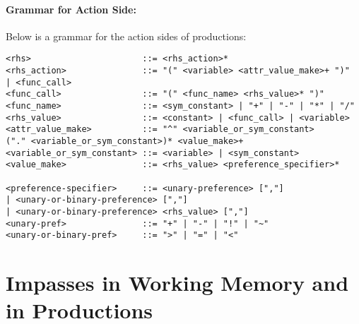 

\paragraph{Grammar for Action Side:}
\label{SYNTAX-pm-actgrammar}



Below is a grammar for the action sides of productions:
\begin{verbatim}
<rhs>                      ::= <rhs_action>*
<rhs_action>               ::= "(" <variable> <attr_value_make>+ ")"
| <func_call>
<func_call>                ::= "(" <func_name> <rhs_value>* ")"
<func_name>                ::= <sym_constant> | "+" | "-" | "*" | "/"
<rhs_value>                ::= <constant> | <func_call> | <variable>
<attr_value_make>          ::= "^" <variable_or_sym_constant>
("." <variable_or_sym_constant>)* <value_make>+
<variable_or_sym_constant> ::= <variable> | <sym_constant>
<value_make>               ::= <rhs_value> <preference_specifier>*

<preference-specifier>     ::= <unary-preference> [","]
| <unary-or-binary-preference> [","]
| <unary-or-binary-preference> <rhs_value> [","]
<unary-pref>               ::= "+" | "-" | "!" | "~"
<unary-or-binary-pref>     ::= ">" | "=" | "<"
\end{verbatim}



\section{Impasses in Working Memory and in Productions}
\label{SYNTAX-impasses}

